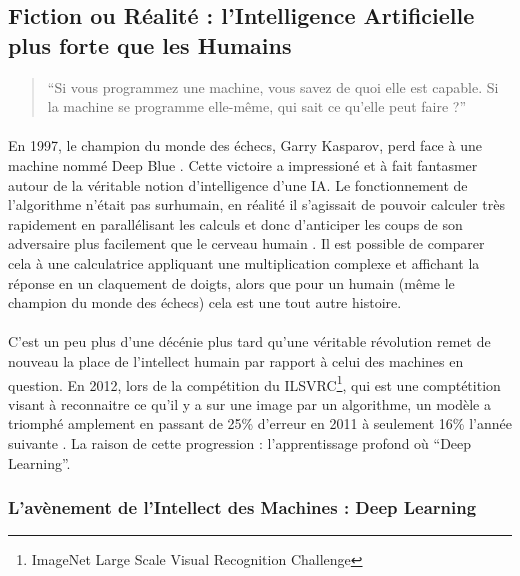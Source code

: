 \documentclass[10pt, french, a4paper]{report}
\begin{document}
\subsection{Fiction ou Réalité : l'Intelligence Artificielle plus forte que les Humains}

\begin{quotation}
  ``Si vous programmez une machine, vous savez de quoi elle est capable. Si la machine se programme elle-même, qui sait ce qu'elle peut faire ?''
\end{quotation}

\paragraph{}
En 1997, le champion du monde des échecs, Garry Kasparov, perd face à une machine nommé Deep Blue \citep{krauthammer_be_1997}. Cette victoire a impressioné et à fait fantasmer autour de la véritable notion d'intelligence d'une IA. Le fonctionnement de l'algorithme n'était pas surhumain, en réalité il s'agissait de pouvoir calculer très rapidement en parallélisant les calculs et donc d’anticiper les coups de son adversaire plus facilement que le cerveau humain \citep{hsu_deep_1995}. Il est possible de comparer cela à une calculatrice appliquant une multiplication complexe et affichant la réponse en un claquement de doigts, alors que pour un humain (même le champion du monde des échecs) cela est une tout autre histoire.

\paragraph{}
C'est un peu plus d'une décénie plus tard qu'une véritable révolution remet de nouveau la place de l'intellect humain par rapport à celui des machines en question. En 2012, lors de la compétition du ILSVRC\footnote{ImageNet Large Scale Visual Recognition Challenge}, qui est une comptétition visant à reconnaitre ce qu'il y a sur une image par un algorithme, un modèle a triomphé amplement en passant de 25\% d'erreur en 2011 à seulement 16\% l'année suivante \citep{ILSVRC15}. La raison de cette progression : l'apprentissage profond où ``Deep Learning''.

\subsubsection{L'avènement de l'Intellect des Machines : Deep Learning}
\end{document}
